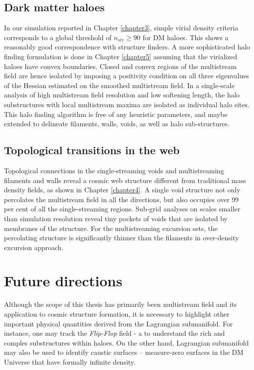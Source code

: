 \subsection{Dark matter haloes}

In our simulation reported in Chapter \ref{chapter3}, simple virial density criteria corresponds to a global threshold of $n_{str} \geq 90$ for DM haloes. This shows a reasonably good correspondence with structure finders. A more sophisticated halo finding formulation is done in Chapter \ref{chapter5} assuming that the virialized haloes have convex boundaries. Closed and convex regions of the multistream field are hence isolated by imposing a positivity condition on all three eigenvalues of the Hessian estimated on the smoothed multistream field. In a single-scale analysis of high multistream field resolution and low softening length, the halo substructures with local multistream maxima are isolated as individual halo sites. This halo finding algorithm is free of any heuristic parameters, and maybe extended to delineate filaments, walls, voids, as well as halo sub-structures. 

\subsection{Topological transitions in the web}

Topological connections in the single-streaming voids and multistreaming filaments and walls reveal a cosmic web structure different from traditional mass density fields, as shown in Chapter \ref{chapter4}. A single void structure not only percolates the multistream field in all the directions, but also occupies over 99 per cent of all the single-streaming regions. Sub-grid analyses on scales smaller than simulation resolution reveal tiny pockets of voids that are isolated by membranes of the structure. For the multistreaming excursion sets, the percolating structure is significantly  thinner than the filaments in over-density excursion approach.  
 

\section{Future directions}

Although the scope of this thesis has primarily been multistream field and its application to cosmic structure formation, it is necessary to highlight other important physical quantities derived from the Lagrangian submanifold. For instance, one may track the {\it Flip-Flop} field - a to understand the rich and comples substructures within haloes. On the other hand, Lagrangian submanifold may also be used to identify caustic surfaces -- measure-zero surfaces in the DM Universe that have formally infinite density. 

